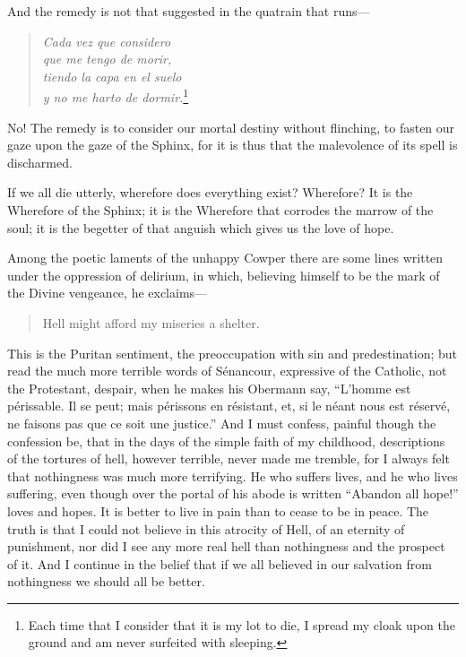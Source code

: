 And the remedy is not that suggested in the quatrain that
runs---

\begin{verse}
\textit{Cada vez que considero\\
que me tengo de morir,\\
tiendo la capa en el suelo\\
y no me harto de dormir.}\footnote{Each time that I
consider that it is my lot to die, I spread my cloak upon the ground
and am never surfeited with sleeping.}
\end{verse}

No! The remedy is to consider our mortal destiny without flinching, to
fasten our gaze upon the gaze of the Sphinx, for it is thus that the
malevolence of its spell is discharmed.

If we all die utterly, wherefore does everything exist? Wherefore? It
is the Wherefore of the Sphinx; it is the Wherefore that corrodes the
marrow of the soul; it is the begetter of that anguish which gives us
the love of hope.

Among the poetic laments of the unhappy Cowper there are some lines
written under the oppression of delirium, in which, believing himself
to be the mark of the Divine vengeance, he exclaims---

\begin{quote}{Hell might afford my miseries a shelter.}
\end{quote}

\noindent This is the Puritan sentiment, the preoccupation with sin
and predestination; but read the much more terrible words of
S\'enancour, expressive of the Catholic, not the Protestant, despair,
when he makes his Obermann say, ``L'homme est p\'erissable. Il se
peut; mais p\'erissons en r\'esistant, et, si le n\'eant nous est
r\'eserv\'e, ne faisons pas que ce soit une justice.'' And I must
confess, painful though the confession be, that in the days of the
simple faith of my childhood, descriptions of the tortures of hell,
however terrible, never made me tremble, for I always felt that
nothingness was much more terrifying. He who suffers lives, and he who
lives suffering, even though over the portal of his abode is written
``Abandon all hope!'' loves and hopes. It is better to live in pain
 than to cease to be in peace. The truth is that I could not
believe in this atrocity of Hell, of an eternity of punishment, nor
did I see any more real hell than nothingness and the prospect of it.
And I continue in the belief that if we all believed in our salvation
from nothingness we should all be better.

